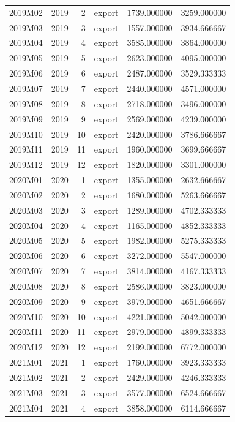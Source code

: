 \begin{tabular}{lrrlrr}
2019M02 & 2019 & 2 & export & 1739.000000 & 3259.000000 \\
2019M03 & 2019 & 3 & export & 1557.000000 & 3934.666667 \\
2019M04 & 2019 & 4 & export & 3585.000000 & 3864.000000 \\
2019M05 & 2019 & 5 & export & 2623.000000 & 4095.000000 \\
2019M06 & 2019 & 6 & export & 2487.000000 & 3529.333333 \\
2019M07 & 2019 & 7 & export & 2440.000000 & 4571.000000 \\
2019M08 & 2019 & 8 & export & 2718.000000 & 3496.000000 \\
2019M09 & 2019 & 9 & export & 2569.000000 & 4239.000000 \\
2019M10 & 2019 & 10 & export & 2420.000000 & 3786.666667 \\
2019M11 & 2019 & 11 & export & 1960.000000 & 3699.666667 \\
2019M12 & 2019 & 12 & export & 1820.000000 & 3301.000000 \\
2020M01 & 2020 & 1 & export & 1355.000000 & 2632.666667 \\
2020M02 & 2020 & 2 & export & 1680.000000 & 5263.666667 \\
2020M03 & 2020 & 3 & export & 1289.000000 & 4702.333333 \\
2020M04 & 2020 & 4 & export & 1165.000000 & 4852.333333 \\
2020M05 & 2020 & 5 & export & 1982.000000 & 5275.333333 \\
2020M06 & 2020 & 6 & export & 3272.000000 & 5547.000000 \\
2020M07 & 2020 & 7 & export & 3814.000000 & 4167.333333 \\
2020M08 & 2020 & 8 & export & 2586.000000 & 3823.000000 \\
2020M09 & 2020 & 9 & export & 3979.000000 & 4651.666667 \\
2020M10 & 2020 & 10 & export & 4221.000000 & 5042.000000 \\
2020M11 & 2020 & 11 & export & 2979.000000 & 4899.333333 \\
2020M12 & 2020 & 12 & export & 2199.000000 & 6772.000000 \\
2021M01 & 2021 & 1 & export & 1760.000000 & 3923.333333 \\
2021M02 & 2021 & 2 & export & 2429.000000 & 4246.333333 \\
2021M03 & 2021 & 3 & export & 3577.000000 & 6524.666667 \\
2021M04 & 2021 & 4 & export & 3858.000000 & 6114.666667 \\

\end{tabular}
